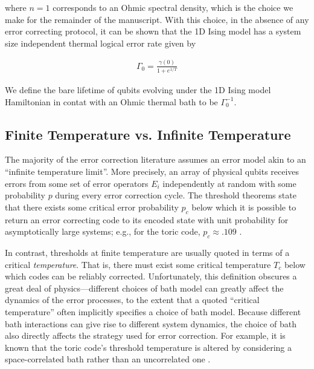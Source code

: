 \documentclass[twocolumn,superscriptaddress,aps,prb,floatfix]{revtex4-1}
\renewcommand*{\emph}[1]{{\it {#1}}}
\begin{document}
where $n=1$ corresponds to an Ohmic spectral density, which is the choice we make for the remainder of the manuscript.  With this choice, in the absence of any error correcting protocol, it can be shown that the 1D Ising model has a system size independent thermal logical error rate given by\cite{Freeman2017}

\begin{align}
\Gamma_0 = \frac{\gamma(0)}{1+e^{1/T}} 
\end{align}

We define the bare lifetime of qubits evolving under the 1D Ising model Hamiltonian in contat with an Ohmic thermal bath to be $\Gamma_0^{-1}$.

\subsection{Finite Temperature vs. Infinite Temperature}
\label{sec:temperature}

 The majority of the error correction literature assumes an error model akin to an ``infinite temperature limit''.  More precisely, an array of physical qubits receives errors from some set of error operators ${E_i}$ independently at random with some probability $p$ during every error correction cycle.  The threshold theorems state that there exists some critical error probability $p_c$ below which it is possible to return an error correcting code to its encoded state with unit probability for asymptotically large systems; e.g., for the toric code, $p_c\approx.109$ \cite{Wang2009}.
 
 In contrast, thresholds at finite temperature are usually quoted in terms of a critical \emph{temperature}.  That is, there must exist some critical temperature $T_c$ below which codes can be reliably corrected.  Unfortunately, this definition obscures a great deal of physics---different choices of bath model can greatly affect the dynamics of the error processes, to the extent that a quoted ``critical temperature'' often implicitly specifies a choice of bath model.  Because different bath interactions can give rise to different system dynamics, the choice of bath also directly affects the strategy used for error correction.  For example, it is known that the toric code's threshold temperature is altered by considering a space-correlated bath rather than an uncorrelated one \cite{Novais2013}.
 
\end{document}
